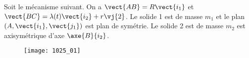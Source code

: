 \normaltrue
\correctionfalse


\setcounter{question}{0}%



\ifcorrection
\else
{}
\fi

\ifprof
\else
Soit le mécanisme suivant. On a $\vect{AB}=R\vect{i_1}$ et $\vect{BC}=\lambda(t)\vect{i_2}+r\vj{2}$. Le solide 1 est de masse $m_1$ et le plan $\left(A,\vect{i_1},\vect{j_1}\right)$ est plan de symétrie. Le solide 2 est de masse $m_2$ est axisymétrique d'axe $\axe{B}{i_2}$.
\begin{figure}[H]
\texttt{[image: 1025\_01]}
\end{figure}
\fi

\ifprof~\\
\else
\fi

\ifprof~\\
\else
\fi

\ifprof~\\
\else
\fi


\ifprof
\else
{}
\fi